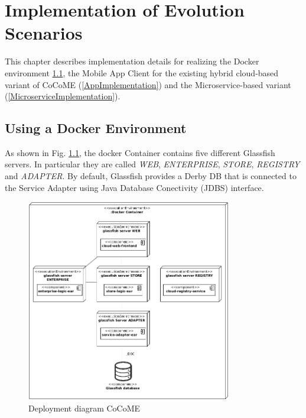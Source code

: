 \chapter{Implementation of Evolution Scenarios}
This chapter describes implementation details for realizing the Docker environment \ref{DockerImplementation}, the Mobile App Client  for the existing hybrid cloud-based variant of CoCoME (\ref{AppImplementation}) and the Microservice-based variant (\ref{MicroserviceImplementation}).


\section{Using a Docker Environment}\label{DockerImplementation}
 	As shown in Fig. \ref*{Deploym_CoCoME}, the docker Container contains five different Glassfish servers. In particular they are called \textit{WEB}, \textit{ENTERPRISE}, \textit{STORE}, \textit{REGISTRY} and \textit{ADAPTER}. By default, Glassfish provides a Derby DB that is connected to the Service Adapter using Java Database Conectivity (JDBS) interface.
 	\begin{figure}[h]
 		\centering
 		\includegraphics[width = 0.8\textwidth]{img/docker_Container_Deployment.png}
 		\caption{Deployment diagram CoCoME}
 		\label{Deploym_CoCoME}
 	\end{figure}
 	
